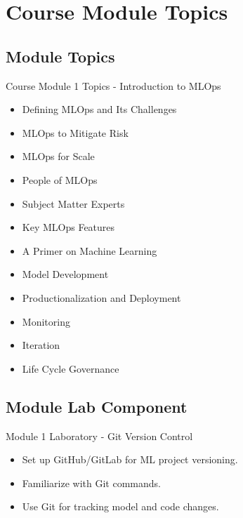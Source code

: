 \documentclass[aspectratio=169]{beamer}
\begin{document}
\section{Course Module Topics}
\subsection{Module Topics}
\begin{frame}{Course Module 1 Topics - Introduction to MLOps}
\begin{itemize}
\item  Defining MLOps and Its Challenges 
\item MLOps to Mitigate Risk 
\item MLOps for Scale 
\item People of MLOps 
\item Subject Matter Experts 
\item  Key MLOps Features 
\item  A Primer on Machine Learning 
\item  Model Development 
\item  Productionalization and Deployment
\item Monitoring 
\item   Iteration 
\item Life Cycle
Governance
\end{itemize}
\end{frame}

\subsection{Module Lab Component}
\begin{frame}{Module 1 Laboratory - Git Version Control}

\begin{itemize}

\item Set up GitHub/GitLab for ML project versioning.
\item Familiarize with Git commands.
\item Use Git for tracking model and code changes.

\end{itemize}

\end{frame}
\end{document}
